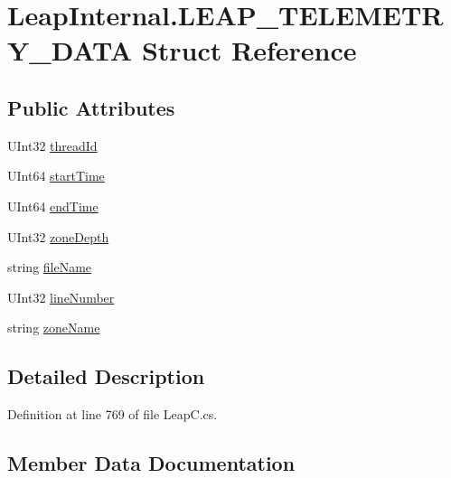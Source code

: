 \hypertarget{struct_leap_internal_1_1_l_e_a_p___t_e_l_e_m_e_t_r_y___d_a_t_a}{}\section{Leap\+Internal.\+L\+E\+A\+P\+\_\+\+T\+E\+L\+E\+M\+E\+T\+R\+Y\+\_\+\+D\+A\+TA Struct Reference}
\label{struct_leap_internal_1_1_l_e_a_p___t_e_l_e_m_e_t_r_y___d_a_t_a}
\subsection*{Public Attributes}
\begin{DoxyCompactItemize}
\item 
U\+Int32 \mbox{\hyperlink{struct_leap_internal_1_1_l_e_a_p___t_e_l_e_m_e_t_r_y___d_a_t_a_a7f9f21be15295603c11a00ecd1dc7cff}{thread\+Id}}
\item 
U\+Int64 \mbox{\hyperlink{struct_leap_internal_1_1_l_e_a_p___t_e_l_e_m_e_t_r_y___d_a_t_a_a6f06f14c2c5d5c0add6c52879a5af00d}{start\+Time}}
\item 
U\+Int64 \mbox{\hyperlink{struct_leap_internal_1_1_l_e_a_p___t_e_l_e_m_e_t_r_y___d_a_t_a_aeb92b4ddba610682d9935988788687f2}{end\+Time}}
\item 
U\+Int32 \mbox{\hyperlink{struct_leap_internal_1_1_l_e_a_p___t_e_l_e_m_e_t_r_y___d_a_t_a_a55bac00f2b23173e47e8429a1ada8708}{zone\+Depth}}
\item 
string \mbox{\hyperlink{struct_leap_internal_1_1_l_e_a_p___t_e_l_e_m_e_t_r_y___d_a_t_a_a499964d025509fa704054246eb0b3ac0}{file\+Name}}
\item 
U\+Int32 \mbox{\hyperlink{struct_leap_internal_1_1_l_e_a_p___t_e_l_e_m_e_t_r_y___d_a_t_a_a40acbc8a5eadde6e6a7cd9176e65bf79}{line\+Number}}
\item 
string \mbox{\hyperlink{struct_leap_internal_1_1_l_e_a_p___t_e_l_e_m_e_t_r_y___d_a_t_a_aefdf51e891fd859de56d1d0627cf3134}{zone\+Name}}
\end{DoxyCompactItemize}


\subsection{Detailed Description}


Definition at line 769 of file Leap\+C.\+cs.



\subsection{Member Data Documentation}
\mbox{\label{struct_leap_internal_1_1_l_e_a_p___t_e_l_e_m_e_t_r_y___d_a_t_a_aeb92b4ddba610682d9935988788687f2}} 
